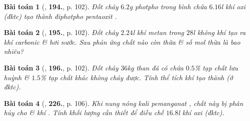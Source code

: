 \documentclass{article}
\numberwithin{equation}{section}
\newtheorem{baitoan}{Bài toán}
\begin{document}
\begin{baitoan}[\cite{An_400_BT_Hoa_Hoc_8_2020}, \textbf{194.}, p. 102]
	Đốt cháy $6.2$\emph{g} photpho trong bình chứa $6.16$\emph{l} khí oxi (đktc) tạo thành điphotpho pentaoxit \emph{}.
\end{baitoan}

\begin{baitoan}[\cite{An_400_BT_Hoa_Hoc_8_2020}, \textbf{195.}, p. 102]
	Đốt cháy $2.24$\emph{l} khí metan trong $28$\emph{l} không khí tạo ra khí carbonic \& hơi nước. Sau phản ứng chất nào còn thừa \& số mol thừa là bao nhiêu?
\end{baitoan}

\begin{baitoan}[\cite{An_400_BT_Hoa_Hoc_8_2020}, \textbf{196.}, p. 102]
	Đốt cháy $36$\emph{kg} than đá có chứa $0.5$\% tạp chất lưu huỳnh \& $1.5$\% tạp chất khác không cháy được. Tính thể tích khí \emph{} tạo thành (ở đktc).
\end{baitoan}

\begin{baitoan}[\cite{An_400_BT_Hoa_Hoc_8_2020}, \textbf{226.}, p. 106]
	Khi nung nóng kali pemanganat \emph{}, chất này bị phân hủy cho \emph{} \& khí \emph{}. Tính khối lượng \emph{} cần thiết để điều chế $16.8$\emph{l} khí oxi (đktc). 
\end{baitoan}


\printbibliography[heading=bibintoc]
	
\end{document}
